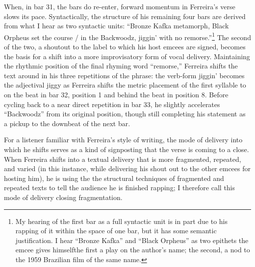 When, in bar 31, the bars do re-enter, forward momentum in Ferreira's verse slows its pace. Syntactically,
the structure of his remaining four bars are derived from what I hear as two syntactic units: ``Bronze Kafka
metamorph, Black Orpheus set the course / in the Backwoodz, jiggin' with no remorse.''\footnote{
    My hearing of the first bar as a full syntactic unit is in part due to his rapping of it within the space
    of one bar, but it has some semantic justification. I hear ``Bronze Kafka'' and ``Black Orpheus'' as two
    epithets the emcee gives himself\textemdash the first a play on the author's name; the second, a nod to the
    1959 Brazilian film of the same name.}
The second of the two, a shoutout to the label to which his host emcees are signed, becomes the basis for a shift
into a more improvisatory form of vocal delivery. Maintaining the rhythmic position of the final rhyming word
``remorse,'' Ferreira shifts the text around in his three repetitions of the phrase: the verb-form jiggin'
becomes the adjectival jiggy as Ferreira shifts the metric placement of the first syllable to on the beat
in bar 32, position 1 and behind the beat in position 8. Before cycling back to a near direct repetition in
bar 33, he slightly accelerates ``Backwoodz'' from its original position, though still completing his statement
as a pickup to the downbeat of the next bar.

For a listener familiar with Ferreira's style of writing, the mode of delivery into which he shifts serves as 
a kind of signposting that the verse is coming to a close. When Ferreira shifts into a textual delivery that
is more fragmented, repeated, and varied (in this instance, while delivering his shout out to the other emcees
for hosting him), he is using the the structural techniques of fragmented and repeated texts to tell the audience
he is finished rapping; I therefore call this mode of delivery closing fragmentation.

